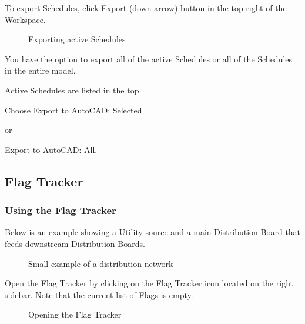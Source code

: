 \documentclass[letterpaper,10pt,english]{sphinxmanual}
\begin{document}
To export Schedules, click Export (down arrow) button in the top right of the Workspace.

\begin{figure}[H]
\centering
\capstart

\noindent{}
\caption{Exporting active Schedules}\label{\detokenize{docs/userguide/buildingelectricalmodel/schedules/index-schedules:id26}}\end{figure}

You have the option to export all of the active Schedules or all of the Schedules in the entire model.

Active Schedules are listed in the top.

Choose Export to AutoCAD: Selected

or

Export to AutoCAD: All.


\subsection{Flag Tracker}
\label{\detokenize{docs/userguide/index-user_guide:flag-tracker}}

\subsubsection{Using the Flag Tracker}
\label{\detokenize{docs/userguide/buildingelectricalmodel/flagtracker/index-flag_tracker:using-the-flag-tracker}}\label{\detokenize{docs/userguide/buildingelectricalmodel/flagtracker/index-flag_tracker:flag-tracker}}\label{\detokenize{docs/userguide/buildingelectricalmodel/flagtracker/index-flag_tracker::doc}}
Below is an example showing a Utility source and a main Distribution Board that feeds downstream Distribution Boards.

\begin{figure}[H]
\centering
\capstart

\noindent{}
\caption{Small example of a distribution network}\label{\detokenize{docs/userguide/buildingelectricalmodel/flagtracker/index-flag_tracker:id1}}\end{figure}

Open the Flag Tracker by clicking on the Flag Tracker icon located on the right sidebar.  Note that the current list of Flags is empty.

\begin{figure}[H]
\centering
\capstart

\noindent{}
\caption{Opening the Flag Tracker}\label{\detokenize{docs/userguide/buildingelectricalmodel/flagtracker/index-flag_tracker:id2}}\end{figure}
\end{document}
